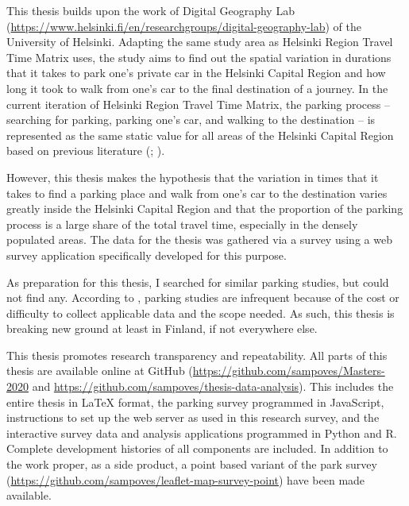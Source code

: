 This thesis builds upon the work of Digital Geography Lab (\textcolor{blue}{\url{https://www.helsinki.fi/en/researchgroups/digital-geography-lab}}) of the University of Helsinki. Adapting the same study area as Helsinki Region Travel Time Matrix uses, the study aims to find out the spatial variation in durations that it takes to park one's private car in the Helsinki Capital Region and how long it took to walk from one's car to the final destination of a journey. In the current iteration of Helsinki Region Travel Time Matrix, the parking process -- searching for parking, parking one's car, and walking to the destination -- is represented as the same static value for all areas of the Helsinki Capital Region based on previous literature (\cite{Tenkanen2020}; \cite{Kalenoja2003}).

However, this thesis makes the hypothesis that the variation in times that it takes to find a parking place and walk from one's car to the destination varies greatly inside the Helsinki Capital Region and that the proportion of the parking process is a large share of the total travel time, especially in the densely populated areas. The data for the thesis was gathered via a survey using a web survey application specifically developed for this purpose.

As preparation for this thesis, I searched for similar parking studies, but could not find any. According to , parking studies are infrequent because of the cost or difficulty to collect applicable data and the scope needed. As such, this thesis is breaking new ground at least in Finland, if not everywhere else.

This thesis promotes research transparency and repeatability. All parts of this thesis are available online at GitHub (\textcolor{blue}{\url{https://github.com/sampoves/Masters-2020}} and \textcolor{blue}{\url{https://github.com/sampoves/thesis-data-analysis}}). This includes the entire thesis in LaTeX format, the parking survey programmed in JavaScript, instructions to set up the web server as used in this research survey, and the interactive survey data and analysis applications programmed in Python and R. Complete development histories of all components are included. In addition to the work proper, as a side product, a point based variant of the park survey (\textcolor{blue}{\url{https://github.com/sampoves/leaflet-map-survey-point}}) have been made available.

